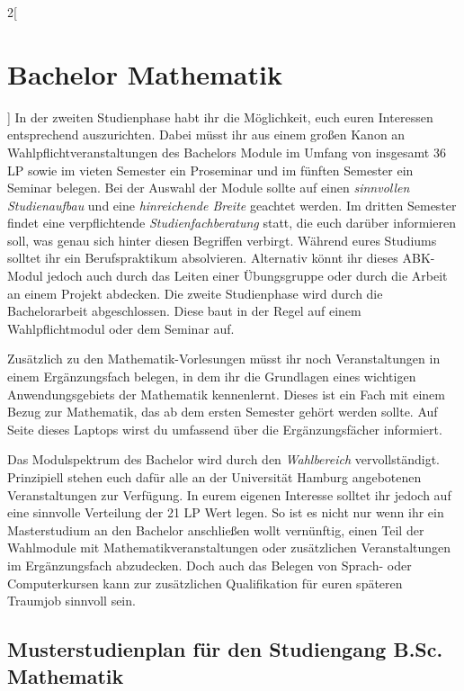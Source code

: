 \begin{multicols}{2}[\section{Bachelor Mathematik}]
In der zweiten Studienphase habt ihr die Möglichkeit, euch euren Interessen
entsprechend auszurichten. Dabei müsst ihr aus einem großen Kanon an
Wahlpflichtveranstaltungen des Bachelors Module im Umfang von insgesamt 36 LP
sowie im vieten Semester ein Proseminar und im fünften Semester ein Seminar
belegen. Bei der Auswahl der Module sollte auf einen \emph{sinnvollen
Studienaufbau} und eine \emph{hinreichende Breite} geachtet werden.  Im dritten
Semester findet eine verpflichtende \emph{Studienfachberatung} statt, die euch
darüber informieren soll, was genau sich hinter diesen Begriffen verbirgt.
Während eures Studiums solltet ihr ein Berufspraktikum absolvieren. Alternativ
könnt ihr dieses ABK-Modul jedoch auch durch das Leiten einer Übungsgruppe oder
durch die Arbeit an einem Projekt abdecken.  Die zweite Studienphase wird durch
die Bachelorarbeit abgeschlossen. Diese baut in der Regel auf einem
Wahlpflichtmodul oder dem Seminar auf.

Zusätzlich zu den Mathematik-Vorlesungen müsst ihr noch Veranstaltungen in
einem Ergänzungsfach belegen, in dem ihr die Grundlagen eines wichtigen
Anwendungsgebiets der Mathematik kennenlernt. Dieses ist ein Fach mit einem
Bezug zur Mathematik, das ab dem ersten Semester gehört werden sollte. Auf
Seite \pageref{page:erg} dieses Laptops wirst du umfassend über die
Ergänzungsfächer informiert.

Das Modulspektrum des Bachelor wird durch den \emph{Wahlbereich}
vervollständigt. Prinzipiell stehen euch dafür alle an der Universität Hamburg
angebotenen Veranstaltungen zur Verfügung.  In eurem eigenen Interesse solltet
ihr jedoch auf eine sinnvolle Verteilung der 21 LP Wert legen. So ist es nicht
nur wenn ihr ein Masterstudium an den Bachelor anschließen wollt vernünftig,
einen Teil der Wahlmodule mit Mathematikveranstaltungen oder zusätzlichen
Veranstaltungen im Ergänzungsfach abzudecken.  Doch auch das Belegen von
Sprach- oder Computerkursen kann zur zusätzlichen Qualifikation für euren
späteren Traumjob sinnvoll sein.
\end{multicols}
\clearpage

\subsection{Musterstudienplan für den Studiengang B.Sc. Mathematik}

